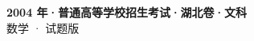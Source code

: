 \documentclass[zihao=-4, a4paper]{ctexart}
\begin{document}
\begin{center}
  {\Large\bfseries 2004 年·普通高等学校招生考试·湖北卷·文科}\\[4pt]
  {\large 数学 · 试题版}
\end{center}
\medskip
{}

\end{document}

